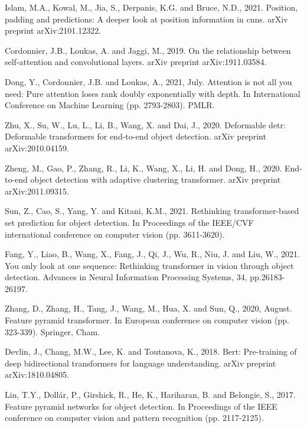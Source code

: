 \begin{thebibliography}{ widest-label }
	Islam, M.A., Kowal, M., Jia, S., Derpanis, K.G. and Bruce, N.D., 2021. Position, padding and predictions: A deeper look at position information in cnns. arXiv preprint arXiv:2101.12322.
	
	Cordonnier, J.B., Loukas, A. and Jaggi, M., 2019. On the relationship between self-attention and convolutional layers. arXiv preprint arXiv:1911.03584.
	
	Dong, Y., Cordonnier, J.B. and Loukas, A., 2021, July. Attention is not all you need: Pure attention loses rank doubly exponentially with depth. In International Conference on Machine Learning (pp. 2793-2803). PMLR.
	
	Zhu, X., Su, W., Lu, L., Li, B., Wang, X. and Dai, J., 2020. Deformable detr: Deformable transformers for end-to-end object detection. arXiv preprint arXiv:2010.04159.
	
	Zheng, M., Gao, P., Zhang, R., Li, K., Wang, X., Li, H. and Dong, H., 2020. End-to-end object detection with adaptive clustering transformer. arXiv preprint arXiv:2011.09315.
	
	Sun, Z., Cao, S., Yang, Y. and Kitani, K.M., 2021. Rethinking transformer-based set prediction for object detection. In Proceedings of the IEEE/CVF international conference on computer vision (pp. 3611-3620).
	
	Fang, Y., Liao, B., Wang, X., Fang, J., Qi, J., Wu, R., Niu, J. and Liu, W., 2021. You only look at one sequence: Rethinking transformer in vision through object detection. Advances in Neural Information Processing Systems, 34, pp.26183-26197.
	
	Zhang, D., Zhang, H., Tang, J., Wang, M., Hua, X. and Sun, Q., 2020, August. Feature pyramid transformer. In European conference on computer vision (pp. 323-339). Springer, Cham.
	
	Devlin, J., Chang, M.W., Lee, K. and Toutanova, K., 2018. Bert: Pre-training of deep bidirectional transformers for language understanding. arXiv preprint arXiv:1810.04805.
	
	Lin, T.Y., Dollár, P., Girshick, R., He, K., Hariharan, B. and Belongie, S., 2017. Feature pyramid networks for object detection. In Proceedings of the IEEE conference on computer vision and pattern recognition (pp. 2117-2125).
	

\end{thebibliography}
